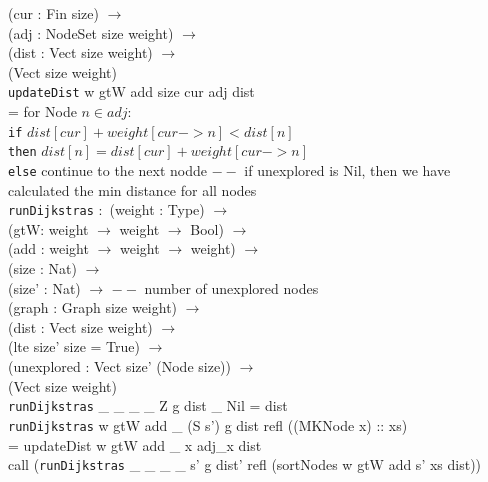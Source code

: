 \documentclass[11pt, oneside]{article}   	%
\newcommand\tab[1][1cm]{\hspace*{#1}}
\begin{document}
            \tab\tab  (cur : Fin size) $\rightarrow$ \\
            \tab\tab  (adj : NodeSet size weight) $\rightarrow$ \\
            \tab\tab  (dist : Vect size weight) $\rightarrow$ \\
            \tab\tab  (Vect size weight)\\
\texttt{updateDist} w gtW add size cur adj dist \\
= for Node $n \in adj$: \\ 
\tab \texttt{if} $dist[cur] + weight[cur -> n] < dist[n]$ \\
      \tab \texttt{then} $dist[n] = dist[cur] + weight[cur -> n]$\\
      \tab \texttt{else} continue to the next nodde
\newline\newline
$--$ if unexplored is Nil, then we have calculated the min distance for all nodes\\
\texttt{runDijkstras} $:$ (weight : Type) $\rightarrow$ \\
            \tab\tab    (gtW: weight $\rightarrow$ weight $\rightarrow$ Bool) $\rightarrow$ \\
            \tab\tab    (add : weight $\rightarrow$ weight $\rightarrow$ weight) $\rightarrow$ \\
            \tab\tab    (size : Nat) $\rightarrow$ \\ 
            \tab\tab    (size' : Nat) $\rightarrow$ $--$ number of unexplored nodes \\
            \tab\tab    (graph : Graph size weight) $\rightarrow$ \\
            \tab\tab    (dist : Vect size weight) $\rightarrow$ \\
            \tab\tab    (lte size' size = True) $\rightarrow$ \\ 
            \tab\tab    (unexplored : Vect size' (Node size)) $\rightarrow$ \\
            \tab\tab    (Vect size weight) \\
\texttt{runDijkstras} \_ \_ \_ \_ Z g dist \_ Nil = dist \\
\texttt{runDijkstras} w gtW add \_ (S s') g dist refl ((MKNode x) :: xs) \\
\tab = updateDist w gtW add \_ x adj\_x dist \\
\tab call (\texttt{runDijkstras} \_ \_ \_ \_ s' g dist' refl (sortNodes w gtW add s' xs dist))\\
\newline\newline
\end{document}
